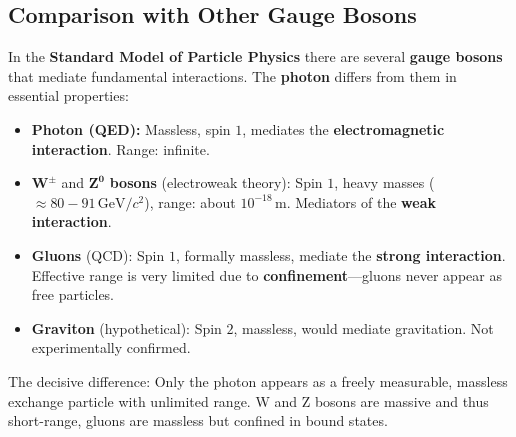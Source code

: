 \subsection{Comparison with Other Gauge Bosons}

In the \textbf{Standard Model of Particle Physics} there are several \textbf{gauge bosons} that mediate fundamental interactions.  
The \textbf{photon} differs from them in essential properties:

\begin{itemize}
	\item \textbf{Photon (QED):} Massless, spin \(1\), mediates the \textbf{electromagnetic interaction}.  
	Range: infinite.
	
	\item \(\mathbf{W^\pm}\) and \(\mathbf{Z^0}\) \textbf{bosons} (electroweak theory):  
	Spin \(1\), heavy masses (\(\approx 80{-}91\,\mathrm{GeV}/c^2\)), range: about \(10^{-18}\,\mathrm{m}\).  
	Mediators of the \textbf{weak interaction}.
	
	\item \textbf{Gluons} (QCD):  
	Spin \(1\), formally massless, mediate the \textbf{strong interaction}.  
	Effective range is very limited due to \textbf{confinement}—gluons never appear as free particles.
	
	\item \textbf{Graviton} (hypothetical):  
	Spin \(2\), massless, would mediate gravitation.  
	Not experimentally confirmed.
\end{itemize}

The decisive difference:  
Only the photon appears as a freely measurable, massless exchange particle with unlimited range.  
W and Z bosons are massive and thus short-range, gluons are massless but confined in bound states.

\vspace{1em}
\begin{tcolorbox}[hinweisbox, title=Comparison of gauge bosons]
	\label{box:eichbosonen_vergleich}
	\small
	
	
\end{tcolorbox}

